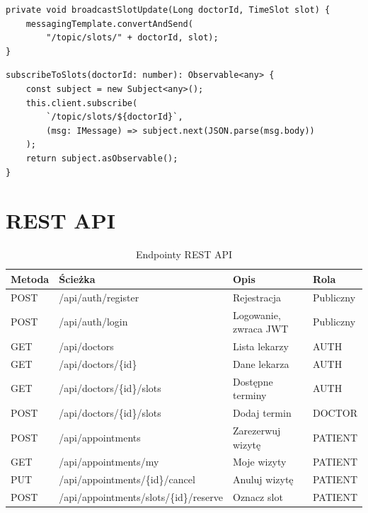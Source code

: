 \documentclass[12pt, a4paper]{article}
\begin{document}
\begin{lstlisting}[style=java, caption={Rozgłaszanie aktualizacji slotu -- TimeSlotService.java}]
private void broadcastSlotUpdate(Long doctorId, TimeSlot slot) {
    messagingTemplate.convertAndSend(
        "/topic/slots/" + doctorId, slot);
}
\end{lstlisting}

\begin{lstlisting}[style=java, caption={Subskrypcja WebSocket -- websocket.ts (Angular)}]
subscribeToSlots(doctorId: number): Observable<any> {
    const subject = new Subject<any>();
    this.client.subscribe(
        `/topic/slots/${doctorId}`,
        (msg: IMessage) => subject.next(JSON.parse(msg.body))
    );
    return subject.asObservable();
}
\end{lstlisting}

\section{REST API}

\begin{table}[H]
\centering
\begin{tabularx}{\textwidth}{llXl}
\toprule
\textbf{Metoda} & \textbf{Ścieżka} & \textbf{Opis} & \textbf{Rola} \\
\midrule
POST & /api/auth/register               & Rejestracja             & Publiczny \\
POST & /api/auth/login                  & Logowanie, zwraca JWT   & Publiczny \\
GET  & /api/doctors                     & Lista lekarzy           & AUTH \\
GET  & /api/doctors/\{id\}              & Dane lekarza            & AUTH \\
GET  & /api/doctors/\{id\}/slots        & Dostępne terminy        & AUTH \\
POST & /api/doctors/\{id\}/slots        & Dodaj termin            & DOCTOR \\
POST & /api/appointments                & Zarezerwuj wizytę       & PATIENT \\
GET  & /api/appointments/my             & Moje wizyty             & PATIENT \\
PUT  & /api/appointments/\{id\}/cancel  & Anuluj wizytę           & PATIENT \\
POST & /api/appointments/slots/\{id\}/reserve & Oznacz slot        & PATIENT \\
\bottomrule
\end{tabularx}
\caption{Endpointy REST API}
\end{table}
\end{document}
